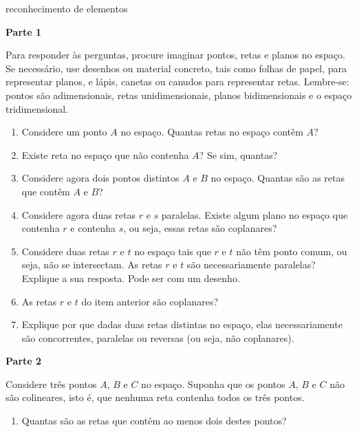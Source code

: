 \begin{task}{reconhecimento de elementos}



\textbf{Parte 1}

Para responder às perguntas, procure imaginar pontos, retas e planos no espaço. Se necessário, use desenhos ou material concreto, tais como folhas de papel, para representar planos, e lápis, canetas ou canudos para representar retas. Lembre-se: pontos são adimensionais, retas unidimensionais, planos bidimensionais e o espaço tridimensional.
\begin{enumerate}
\item {} 
Considere um ponto \(A\) no espaço. Quantas retas no espaço contêm \(A\)?

\item {} 
Existe reta no espaço que não contenha \(A\)? Se sim, quantas?

\item {} 
Considere agora dois pontos distintos \(A\) e \(B\) no espaço. Quantas são as retas que contêm \(A\) e \(B\)?

\item {} 
Considere agora duas retas \(r\) e \(s\) paralelas. Existe algum plano no espaço que contenha \(r\) e contenha \(s\), ou seja, essas retas são coplanares?

\item {} 
Considere duas retas \(r\) e \(t\) no espaço tais que \(r\) e \(t\) não têm ponto comum, ou seja, não se intersectam. As retas \(r\) e \(t\) são necessariamente paralelas? Explique a sua resposta. Pode ser com um desenho.

\item {} 
As retas \(r\) e \(t\) do item anterior são coplanares?

\item {} 
Explique por que dadas duas retas distintas no espaço, elas necessariamente são concorrentes, paralelas ou reversas (ou seja, não coplanares).

\end{enumerate}

\textbf{Parte 2}

Considere três pontos \(A\), \(B\) e \(C\) no espaço. Suponha que os pontos \(A\), \(B\) e \(C\) não são colineares, isto é, que nenhuma reta contenha todos os três pontos.
\begin{enumerate}
\item {} 
Quantas são as retas que contêm ao menos dois destes pontos?


\end{enumerate}
\end{task}
